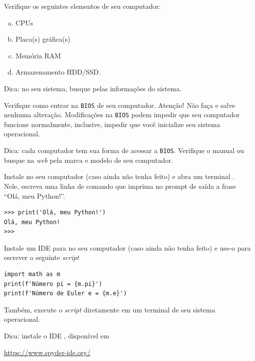 \begin{exer}
  Verifique os seguintes elementos de seu computador:
  \begin{enumerate}[a)]
  \item CPUs
  \item Placa(s) gráfica(s)
  \item Memória RAM
  \item Armazenamento HDD/SSD.
  \end{enumerate}
\end{exer}
\begin{resp}
  Dica: no seu sistema, busque pelas informações do sistema.
\end{resp}

\begin{exer}
  Verifique como entrar na \lstinline+BIOS+ de seu computador. Atenção! Não faça e salve nenhuma alteração. Modificações na \lstinline+BIOS+ podem impedir que seu computador funcione normalmente, inclusive, impedir que você inicialize seu sistema operacional.
\end{exer}
\begin{resp}
  Dica: cada computador tem sua forma de acessar a \lstinline+BIOS+. Verifique o manual ou busque na \textit{web} pela marca e modelo de seu computador.
\end{resp}

\begin{exer}
  Instale {\python} no seu computador (caso ainda não tenha feito) e abra um terminal {\python}. Nele, escreva uma linha de comando que imprima no prompt de saída a frase ``Olá, meu Python!''.
\end{exer}
\begin{resp}

\begin{lstlisting}
>>> print('Olá, meu Python!')
Olá, meu Python!
>>> 
\end{lstlisting}

\end{resp}

\begin{exer}
  Instale um IDE para {\python} no seu computador (caso ainda não tenha feito) e use-o para escrever o seguinte \textit{script}

\begin{lstlisting}
import math as m
print(f'Número pi = {m.pi}')
print(f'Número de Euler e = {m.e}')
\end{lstlisting}

  Também, execute o \textit{script} diretamente em um terminal de seu sistema operacional.
\end{exer}
\begin{resp}
  Dica: instale o IDE {\spyder}, disponível em
  \begin{center}
    \url{https://www.spyder-ide.org/}
  \end{center}
\end{resp}

